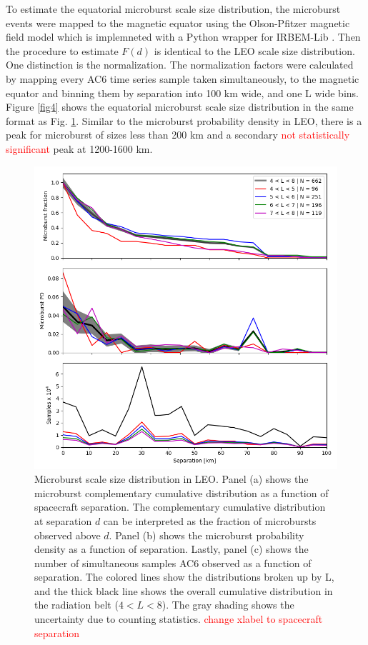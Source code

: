 \documentclass[draft]{agujournal2019}
\begin{document}
To estimate the equatorial microburst scale size distribution, the microburst events were mapped to the magnetic equator using the Olson-Pfitzer magnetic field model \cite{Olson1982} which is implemneted with a Python wrapper for IRBEM-Lib \cite{irbem}. Then the procedure to estimate $F(d)$ is identical to the LEO scale size distribution. One distinction is the normalization. The normalization factors were calculated by mapping every AC6 time series sample taken simultaneously, to the magnetic equator and binning them by separation into 100 km wide, and one L wide bins. Figure \ref{fig4} shows the equatorial microburst scale size distribution in the same format as Fig. \ref{fig3}. Similar to the microburst probability density in LEO, there is a peak for microburst of sizes less than 200 km and a secondary \textcolor{red}{not statistically significant} peak at 1200-1600 km.

\begin{figure}
\includegraphics[width=\textwidth]{fig3.png}
\caption{Microburst scale size distribution in LEO. Panel (a) shows the microburst complementary cumulative distribution as a function of spacecraft separation. The complementary cumulative distribution at separation $d$ can be interpreted as the fraction of microbursts observed above $d$. Panel (b) shows the microburst probability density as a function of separation. Lastly, panel (c) shows the number of simultaneous samples AC6 observed as a function of separation. The colored lines show the distributions broken up by L, and the thick black line shows the overall cumulative distribution in the radiation belt ($4 < L < 8$). The gray shading shows the uncertainty due to counting statistics. \textcolor{red}{change xlabel to spacecraft separation}}
\label{fig3}
\end{figure}
\end{document}
